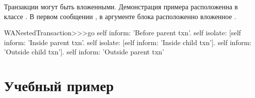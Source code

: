 \documentclass[a4paper,10pt,twoside]{book}
\begin{document}

Транзакции могут быть вложенными.
Демонстрация примера расположенна в классе .
В первом сообщении ,
в аргументе блока расположенно вложенное .

\begin{code}{}
WANestedTransaction>>>go
	self inform: 'Before parent txn'.
	self isolate:
			[self inform: 'Inside parent txn'.
			self isolate: [self inform: 'Inside child txn'].
			self inform: 'Outside child txn'].
	self inform: 'Outside parent txn'
\end{code}




\section{Учебный пример}


\end{document}
